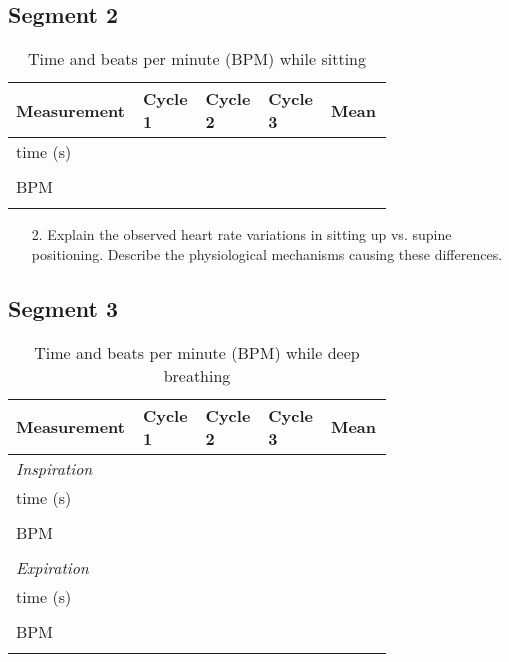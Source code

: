 \documentclass{article}
\begin{document}
\subsection*{Segment 2}
\begin{table}[h]
	\centering
	\caption{Time and beats per minute (BPM) while sitting}
	\begin{tabular}[h!]{p{0.15\linewidth}|p{0.15\linewidth}p{0.15\linewidth}p{0.15\linewidth}p{0.15\linewidth}}
	\toprule
	Measurement & Cycle 1 & Cycle 2 & Cycle 3 & Mean\\
	\midrule
	\textDelta time (s) & & & &\\& & & &\\
	BPM & & & &\\& & & &\\
	\bottomrule
	\end{tabular}
	\end{table}
	
\begin{itemize}
	\item[2.] Explain the observed heart rate variations in sitting up vs. supine positioning. Describe the physiological mechanisms causing these differences.\vspace{3.5cm}
\end{itemize}

\subsection*{Segment 3}
\begin{table}[h]
	\centering
	\caption{Time and beats per minute (BPM) while deep breathing}
	\begin{tabular}[h!]{p{0.15\linewidth}|p{0.15\linewidth}p{0.15\linewidth}p{0.15\linewidth}p{0.15\linewidth}}
	\toprule
	Measurement & Cycle 1 & Cycle 2 & Cycle 3 & Mean\\
	\midrule
	\textit{Inspiration} & & & &\\
	\textDelta time (s) & & & &\\& & & &\\
	BPM & & & &\\& & & &\\
	\textit{Expiration} & & & &\\
	\textDelta time (s) & & & &\\& & & &\\
	BPM & & & &\\& & & &\\
	\bottomrule
	\end{tabular}
	\end{table}
	
\end{document}
